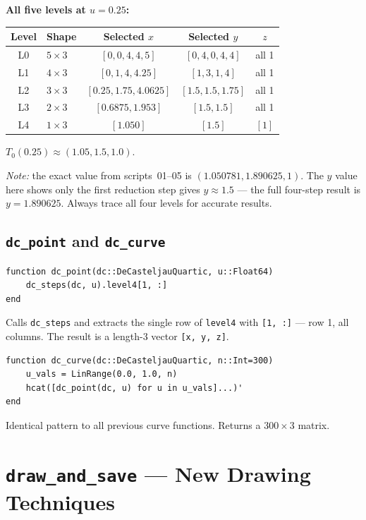 \documentclass[12pt, a4paper]{article}
\newcommand{\cd}[1]{\texttt{#1}}
\begin{document}
\begin{examplebox}
\textbf{All five levels at $u=0.25$:}

\medskip
\begin{tabular}{clccc}
\toprule
Level & Shape & Selected $x$ & Selected $y$ & $z$ \\
\midrule
L0 & $5\times3$ & $[0,0,4,4,5]$ & $[0,4,0,4,4]$ & all 1 \\
L1 & $4\times3$ & $[0,1,4,4.25]$ & $[1,3,1,4]$ & all 1 \\
L2 & $3\times3$ & $[0.25,1.75,4.0625]$ & $[1.5,1.5,1.75]$ & all 1 \\
L3 & $2\times3$ & $[0.6875,1.953]$ & $[1.5,1.5]$ & all 1 \\
L4 & $1\times3$ & $[1.050]$ & $[1.5]$ & $[1]$ \\
\bottomrule
\end{tabular}

\medskip
$T_0(0.25) \approx (1.05, 1.5, 1.0)$.

\textit{Note:} the exact value from scripts~01--05 is
$(1.050781, 1.890625, 1)$.
The $y$ value here shows only the first reduction step
gives $y\approx1.5$ --- the full four-step result
is $y=1.890625$. Always trace all four levels for
accurate results.
\end{examplebox}

\subsection{\texttt{dc\_point} and \texttt{dc\_curve}}

\begin{verbatim}
function dc_point(dc::DeCasteljauQuartic, u::Float64)
    dc_steps(dc, u).level4[1, :]
end
\end{verbatim}

Calls \cd{dc\_steps} and extracts the single row of
\cd{level4} with \cd{[1, :]} --- row 1, all columns.
The result is a length-3 vector \cd{[x, y, z]}.

\begin{verbatim}
function dc_curve(dc::DeCasteljauQuartic, n::Int=300)
    u_vals = LinRange(0.0, 1.0, n)
    hcat([dc_point(dc, u) for u in u_vals]...)'
end
\end{verbatim}

Identical pattern to all previous curve functions.
Returns a $300\times3$ matrix.


\section{\texttt{draw\_and\_save} --- New Drawing Techniques}
\end{document}
